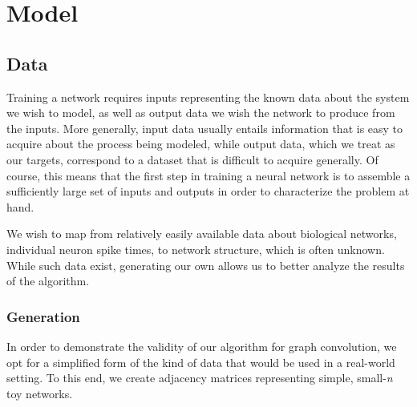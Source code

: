 \graphicspath{ {resources/} }
\chapter{Model}
\label{model}

\section{Data}
\label{sec:data}
Training a network requires inputs representing the known data about the system 
we
wish to model, as well as output data we wish the network to produce from the
inputs. More generally, input data usually entails information that is easy to 
acquire about the process being modeled, while output data, which we treat as 
our targets,
correspond to a dataset that is difficult to acquire generally. Of course, this 
means that the first step in training a neural network is to assemble a 
sufficiently large set of inputs and outputs in order to characterize the 
problem at hand.

We wish to map from relatively easily available data about biological networks, 
individual neuron spike times, to network structure, which is often unknown.  
While such data exist, generating our own allows us to better analyze the 
results of the algorithm.


\subsection{Generation}
\label{subsec:generation}
In order to demonstrate the validity of our algorithm for graph convolution, we 
opt for a simplified form of the kind of data that would be used in a real-world 
setting.  To this end, we create adjacency matrices representing simple, 
small-\textit{n} toy networks.

